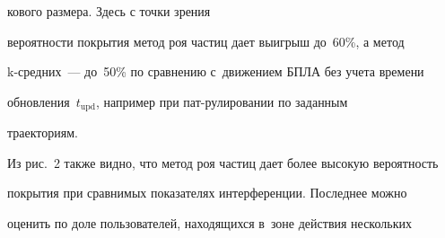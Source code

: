 




\noindent


кового размера. Здесь с точки зрения 


вероятности покрытия метод роя час\-тиц дает выигрыш до~60\%, а метод  


k-средн\-их~--- до~50\% по сравнению с~движением БПЛА без учета времени 


об\-нов\-ле\-ния~$t_{\mathrm{upd}}$, например при пат-\linebreak ру\-ли\-ро\-ва\-нии по заданным 


тра\-ек\-то\-риям. 


  








Из рис.~2 также видно, что метод роя частиц дает более высокую вероятность 


покрытия при сравнимых показателях интерференции. Последнее можно 


оценить по доле пользователей, находящихся в~зоне действия нескольких 


